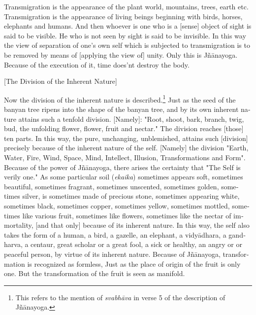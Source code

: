 \begin{otherlanguage}{english}
\begin{tlate}
   Transmigration is the appearance of the plant world, mountains, trees, earth etc. Transmigration is the appearance of living beings beginning with birds, horses, elephants and humans. And then whoever is one who is a [sense] object of sight is said to be visible. He who is not seen by sight is said to be invisible. In this way the view of separation of one's own self which is subjected to transmigration is to be removed by means of [applying the view of] unity. Only this is Jñānayoga. Because of the execution of it, time does'nt destroy the body.
\end{tlate}
      \bigskip
        \centerline{\textrm{\small{[The Division of the Inherent Nature]}}}
          \bigskip
\begin{tlate}    
  Now the division of the inherent nature is described.\footnote{This refers to the mention of \textit{svabhāva} in verse 5 of the description of Jñānayoga.} Just as the seed of the banyan tree ripens into the shape of the banyan tree, and by its own inherent nature attains such a tenfold division. [Namely]: "Root, shoot, bark, branch, twig, bud, the unfolding flower, flower, fruit and nectar." The division reaches [those] ten parts. In this way, the pure, unchanging, unblemished, attains such [division] precisely because of the inherent nature of the self. [Namely] the division "Earth, Water, Fire, Wind, Space, Mind, Intellect, Illusion, Transformations and Form". Because of the power of Jñānayoga, there arises the certainty that "The Self is verily one." As some particular soil (\textit{ekaika}) sometimes appears soft, sometimes beautiful, sometimes fragrant, sometimes unscented, sometimes golden, sometimes silver, is sometimes made of precious stone, sometimes appearing white, sometimes black, sometimes copper, sometimes yellow, sometimes mottled, sometimes like various fruit, sometimes like flowers, sometimes like the nectar of immortality, [and that only] because of its inherent nature. In this way, the self also takes the form of a human, a bird, a gazelle, an elephant, a vidyādhara, a gandharva, a centaur, great scholar or a great fool, a sick or healthy, an angry or or peaceful person, by virtue of its inherent nature. Because of Jñānayoga, transformation is recognized as formless, Just as the place of origin of the fruit is only one. But the transformation of the fruit is seen as manifold.
  

\end{tlate}
\end{otherlanguage}
